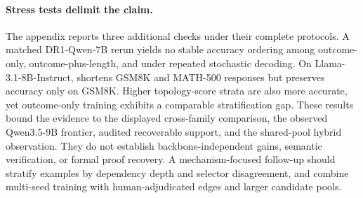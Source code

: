 \paragraph{Stress tests delimit the claim.}
The appendix reports three additional checks under their complete protocols. A matched DR1-Qwen-7B rerun yields no stable accuracy ordering among outcome-only, outcome-plus-length, and \method under repeated stochastic decoding. On Llama-3.1-8B-Instruct, \method shortens GSM8K and MATH-500 responses but preserves accuracy only on GSM8K. Higher topology-score strata are also more accurate, yet outcome-only training exhibits a comparable stratification gap. These results bound the evidence to the displayed cross-family comparison, the observed Qwen3.5-9B frontier, audited recoverable support, and the shared-pool hybrid observation. They do not establish backbone-independent gains, semantic verification, or formal proof recovery. A mechanism-focused follow-up should stratify examples by dependency depth and selector disagreement, and combine multi-seed training with human-adjudicated edges and larger candidate pools.




